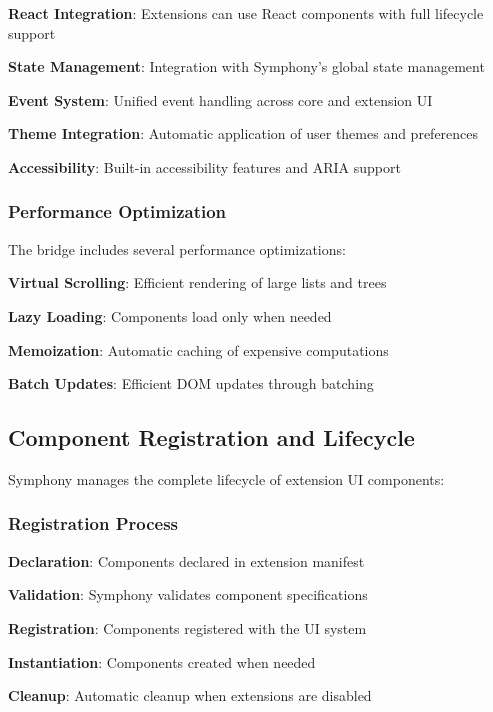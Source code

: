 \begin{expandedlist}
    \item \textbf{React Integration}: Extensions can use React components with full lifecycle support
    \item \textbf{State Management}: Integration with Symphony's global state management
    \item \textbf{Event System}: Unified event handling across core and extension UI
    \item \textbf{Theme Integration}: Automatic application of user themes and preferences
    \item \textbf{Accessibility}: Built-in accessibility features and ARIA support
\end{expandedlist}

\subsubsection*{Performance Optimization}

The bridge includes several performance optimizations:

\begin{compactlist}
    \item \textbf{Virtual Scrolling}: Efficient rendering of large lists and trees
    \item \textbf{Lazy Loading}: Components load only when needed
    \item \textbf{Memoization}: Automatic caching of expensive computations
    \item \textbf{Batch Updates}: Efficient DOM updates through batching
\end{compactlist}

\subsection*{Component Registration and Lifecycle}

Symphony manages the complete lifecycle of extension UI components:

\subsubsection*{Registration Process}

\begin{expandedlist}
    \item \textbf{Declaration}: Components declared in extension manifest
    \item \textbf{Validation}: Symphony validates component specifications
    \item \textbf{Registration}: Components registered with the UI system
    \item \textbf{Instantiation}: Components created when needed
    \item \textbf{Cleanup}: Automatic cleanup when extensions are disabled
\end{expandedlist}

